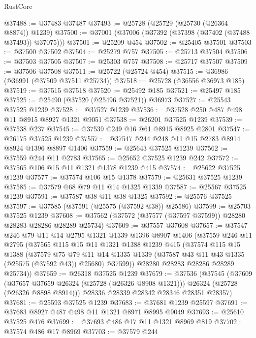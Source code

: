 \begin{lexlean}{RustCore}
\begin{coremodule}
@37488 := @37483 @37487
@37493 := @25728 (@25729 (@25730 (@26364 @8874)) @1239)
@37500 := @37001 (@37006 (@37392 (@37398 (@37402 (@37488 @37493)) @37075)))
@37501 := @25209 @454
@37502 := @25405 @37501
@37503 := @37500 @37502
@37504 := @25279 @757
@37505 := @25713 @37504
@37506 := @37503 @37505
@37507 := @25303 @757
@37508 := @25717 @37507
@37509 := @37506 @37508
@37511 := @25722 (@25724 @454)
@37515 := @36986 (@36991 (@37509 @37511 @25734))
@37518 := @25728 (@36556 @36973 @185)
@37519 := @37515 @37518
@37520 := @25492 @185
@37521 := @25497 @185
@37525 := @25490 (@37520 (@25496 @37521)) @36973
@37527 := @25543 @37525 @1239
@37528 := @37527 @1239
@37536 := @37528 @250 @487 @498 @11 @8915 @8927 @1321 @9051
@37538 := @26201 @37525 @1239
@37539 := @37538 @237
@37545 := @37539 @249 @16 @61 @8915 @8925 @2801
@37547 := @26175 @37525 @1239
@37557 := @37547 @244 @248 @11 @15 @2783 @8914 @8924 @1396 @8897 @1406
@37559 := @25643 @37525 @1239
@37562 := @37559 @244 @11 @2783
@37565 := @25652 @37525 @1239 @242
@37572 := @37565 @106 @15 @11 @1321 @1378 @1239 @415
@37574 := @25622 @37525 @1239
@37577 := @37574 @106 @15 @1378
@37579 := @25631 @37525 @1239
@37585 := @37579 @68 @79 @11 @14 @1325 @1339
@37587 := @25567 @37525 @1239
@37591 := @37587 @38 @11 @38 @1325
@37592 := @25576 @37525
@37597 := @37585 (@37591 (@25575 (@37592 @38)) @25586)
@37599 := @25703 @37525 @1239
@37608 := @37562 (@37572 (@37577 (@37597 @37599)) @28280 @28283 @28286 @28289 @25734)
@37609 := @37557 @37608
@37657 := @37547
    @246
    @79
    @11
    @14
    @2795
    @1321
    @1339
    @1396
    @8907
    @1406
    (@37559
      @246
      @11
      @2795
      (@37565
        @115
        @15
        @11
        @1321
        @1388
        @1239
        @415
        (@37574
          @115
          @15
          @1388
          (@37579
            @75
            @79
            @11
            @14
            @1335
            @1339
            (@37587 @43 @11 @43 @1335 (@25575 (@37592 @43)) @25680)
            @37599))
        @28280
        @28283
        @28286
        @28289
        @25734))
@37659 := @26318 @37525 @1239
@37679 := @37536
    (@37545
      (@37609
        (@37657 @37659 @26324 (@25728 (@26326 @8908 @1321)))
        @26324
        (@25728 (@26326 @8898 @8914)))
      @28336
      @28339
      @28342
      @28346
      @28351
      @28357)
@37681 := @25593 @37525 @1239
@37683 := @37681 @1239 @25597
@37691 := @37683 @8927 @487 @498 @11 @1321 @8971 @8995 @9049
@37693 := @25610 @37525 @476
@37699 := @37693 @486 @17 @11 @1321 @8969 @819
@37702 := @37574 @486 @17 @8969
@37703 := @37579 @244

\end{coremodule}
\end{lexlean}
